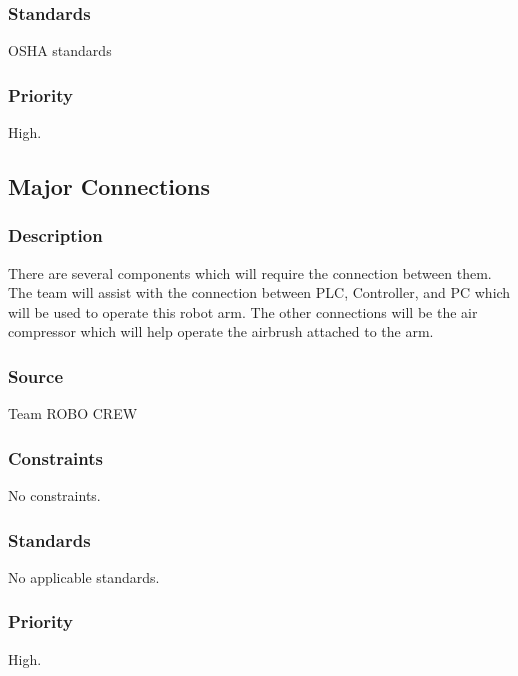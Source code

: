 \subsubsection{Standards}
OSHA standards 
\subsubsection{Priority}
High.

\subsection{Major Connections}
\subsubsection{Description}
There are several components which will require the connection between them. The team will assist with the connection between PLC, Controller, and PC which will be used to operate this robot arm. The other connections will be the air compressor which will help operate the airbrush attached to the arm. \subsubsection{Source}
Team ROBO CREW 
\subsubsection{Constraints}
No constraints.
\subsubsection{Standards}
No applicable standards. 
\subsubsection{Priority}
High.